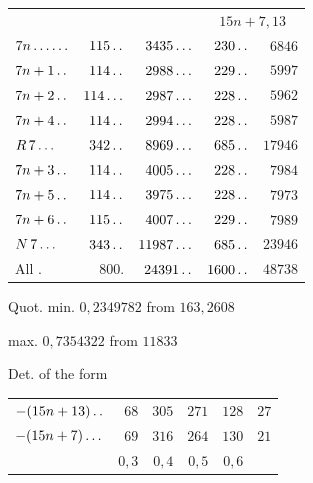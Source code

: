 \begin{center}\begin{tabular}{@{}lrrrr@{}}
& & & \multicolumn{2}{c}{$15n+7{,}13$}\\
$7n\mathinner{.\,.\,.\,.\,.\,.}$ & $115\mathinner{.\,.}$ & $3435\mathinner{.\,.\,.}$ & $230\mathinner{.\,.}$ & $6846$\\
$7n+1\mathinner{.\,.}$ & $114\mathinner{.\,.}$ & $2988\mathinner{.\,.\,.}$ & $229\mathinner{.\,.}$ & $5997$\\
$7n+2\mathinner{.\,.}$ & $114\mathinner{.\,.\,.}$ & $2987\mathinner{.\,.\,.}$ & $228\mathinner{.\,.}$ & $5962$\\
$7n+4\mathinner{.\,.}$ & $114\mathinner{.\,.}$ & $2994\mathinner{.\,.\,.}$ & $228\mathinner{.\,.}$ & $5987$\\
$R\,7\mathinner{.\,.\,.}$ & $342\mathinner{.\,.}$ & $8969\mathinner{.\,.\,.}$ & $685\mathinner{.\,.}$ & $17946$\\
$7n+3\mathinner{.\,.}$ & $114\mathinner{.\,.}$ & $4005\mathinner{.\,.\,.}$ & $228\mathinner{.\,.}$ & $7984$\\
$7n+5\mathinner{.\,.}$ & $114\mathinner{.\,.}$ & $3975\mathinner{.\,.\,.}$ & $228\mathinner{.\,.}$ & $7973$\\
$7n+6\mathinner{.\,.}$ & $115\mathinner{.\,.}$ & $4007\mathinner{.\,.\,.}$ & $229\mathinner{.\,.}$ & $7989$\\
$N\,7\mathinner{.\,.\,.}$ & $343\mathinner{.\,.}$ & $11987\mathinner{.\,.\,.}$ & $685\mathinner{.\,.}$ & $23946$\\
All . & $800.$ & $24391\mathinner{.\,.}$ & $1600\mathinner{.\,.}$ & $48738$
\end{tabular}\end{center}
\noindent Quot. min. $0{,}2349782$ from $163{,}2608$
\par\noindent\quad max. $0{,}7354322$ from $11833$
\par\noindent Det. of the form
\begin{center}\begin{tabular}{@{}lrrrrr@{}}
$-(15n+13)\mathinner{.\,.}$ & $68$ & $305$ & $271$ & $128$ & $27$\\
$-(15n+7)\mathinner{.\,.\,.}$ & $69$ & $316$ & $264$ & $130$ & $21$\\
& $0{,}3$ & $0{,}4$ & $0{,}5$ & $0{,}6$ &
\end{tabular}\end{center}
\par\medskip
{}
